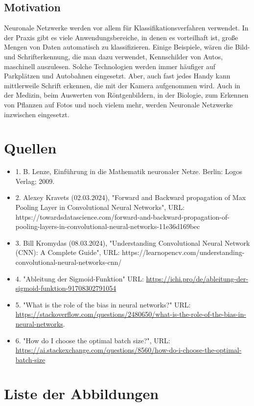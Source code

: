\documentclass[12pt]{article}
\begin{document}
\subsection{Motivation}
Neuronale Netzwerke werden vor allem für Klassifikationsverfahren verwendet. In der Praxis gibt es viele Anwendungsbereiche, in denen es vorteilhaft ist, große Mengen von Daten automatisch zu klassifizieren. Einige Beispiele, wären die Bild- und Schrifterkennung, die man dazu verwendet, Kennschilder von Autos, maschinell auszulesen. Solche Technologien werden immer häufiger auf Parkplätzen und Autobahnen eingesetzt. Aber, auch fast jedes Handy kann mittlerweile Schrift erkennen, die mit der Kamera aufgenommen wird. Auch in der Medizin, beim Auswerten von Röntgenbildern, in der Biologie, zum Erkennen von Pflanzen auf Fotos und noch vielem mehr, werden Neuronale Netzwerke inzwischen eingesetzt.\\

\cleardoublepage
\sloppy
\section{Quellen}
\begin{itemize}
\item 1. B. Lenze, Einführung in die Mathematik neuronaler Netze. Berlin: Logos Verlag; 2009.
\item 2. Alexey Kravets (02.03.2024), "Forward and Backward propagation of Max Pooling Layer in Convolutional Neural Networks", URL: https://towardsdatascience.com/forward-and-backward-propagation-of-pooling-layers-in-convolutional-neural-networks-11e36d169bec
\item 3. Bill Kromydas (08.03.2024), "Understanding Convolutional Neural Network (CNN): A Complete Guide", URL: https://learnopencv.com/understanding-convolutional-neural-networks-cnn/



\item 4. "Ableitung der Sigmoid-Funktion" URL: \url{https://ichi.pro/de/ableitung-der-sigmoid-funktion-91708302791054}
\item 5. "What is the role of the bias in neural networks?" URL: \url{https://stackoverflow.com/questions/2480650/what-is-the-role-of-the-bias-in-neural-networks}.
\item 6. "How do I choose the optimal batch size?", URL: \url{https://ai.stackexchange.com/questions/8560/how-do-i-choose-the-optimal-batch-size}
\end{itemize}

\cleardoublepage
\section{Liste der Abbildungen}
\listoffigures
\end{document}
